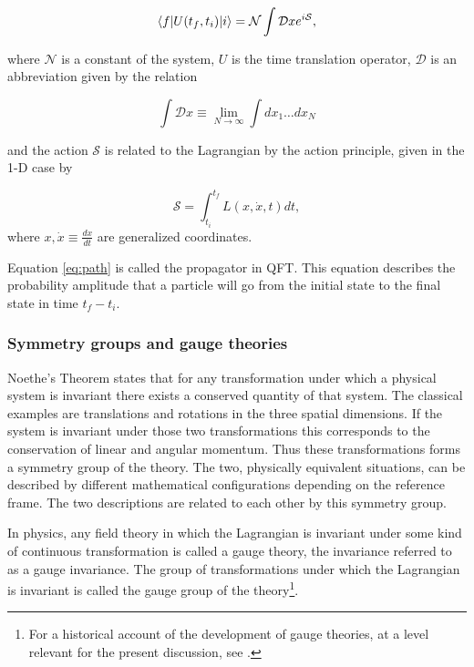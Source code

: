 \begin{equation} \label{eq:path}
	\langle f| U(t_f,t_i) |i \rangle = \mathcal{N} \int \mathcal{D}x e^{i\mathcal{S}},
\end{equation}

where $\mathcal{N}$ is a constant of the system, $U$ is the time translation operator, $\mathcal{D}$ is an abbreviation given by the relation 

\begin{equation}
	\int \mathcal{D} x \equiv \lim_{N \to \infty} \int dx_1 \dots dx_N
\end{equation}

and the action $\mathcal{S}$ is related to the Lagrangian by the action principle, given in the 1-D case by

\begin{equation}
	\mathcal{S} = \int_{t_i}^{t_f} L(x,\dot{x},t)dt,
\end{equation}
where $x, \dot{x} \equiv \frac{dx}{dt}$ are generalized coordinates.

Equation \eqref{eq:path} is called the propagator in QFT. This equation describes the probability amplitude that a particle will go from the initial state to the final state in time $t_f - t_i$.

\subsubsection{Symmetry groups and gauge theories}
Noethe's Theorem states that for any transformation under which a physical system is invariant there exists a conserved quantity of that system. The classical examples are translations and rotations in the three spatial dimensions. If the system is invariant under those two transformations this corresponds to the conservation of linear and angular momentum. Thus these transformations forms a symmetry group of the theory. The two, physically equivalent situations, can be described by different mathematical configurations depending on the reference frame. The two descriptions are related to each other by this symmetry group.

In physics, any field theory in which the Lagrangian is invariant under some kind of continuous transformation is called a gauge theory, the invariance referred to as a gauge invariance. The group of transformations under which the Lagrangian is invariant is called the gauge group of the theory\footnote{For a historical account of the development of gauge theories, at a level relevant for the present discussion, see  \cite{gross1992gtp}.}.

